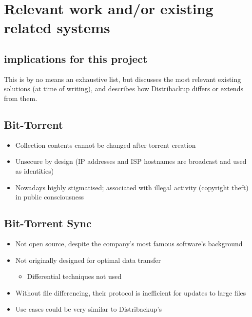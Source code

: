 \documentclass[12pt,a4paper,]{adreport}
\begin{document}
\section{Relevant work and/or existing related
systems}\label{relevant-work-andor-existing-related-systems}

\subsection{implications for this
project}\label{implications-for-this-project}

This is by no means an exhaustive list, but discusses the most relevant
existing solutions (at time of writing), and describes how Distribackup
differs or extends from them.

\subsection{Bit-Torrent}\label{bit-torrent}

\begin{itemize}
\itemsep1pt\parskip0pt
\item
  Collection contents cannot be changed after torrent creation
\item
  Unsecure by design (IP addresses and ISP hostnames are broadcast and
  used as identities)
\item
  Nowadays highly stigmatised; associated with illegal activity
  (copyright theft) in public consciousness
\end{itemize}

\subsection{Bit-Torrent Sync}\label{bit-torrent-sync}

\begin{itemize}
\itemsep1pt\parskip0pt
\item
  Not open source, despite the company's most famous software's
  background
\item
  Not originally designed for optimal data transfer

  \begin{itemize}
  \itemsep1pt\parskip0pt
  \item
    Differential techniques not used
  \end{itemize}
\item
  Without file differencing, their protocol is inefficient for updates
  to large files
\item
  Use cases could be very similar to Distribackup's
\end{itemize}
\end{document}
